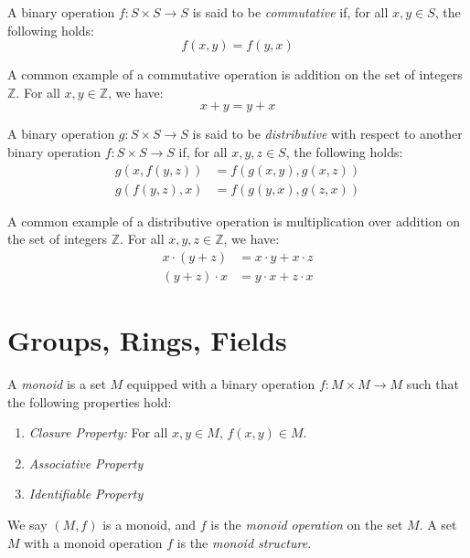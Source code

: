 \documentclass[11pt,fleqn]{book} %
\begin{document}
\begin{definition}
    A binary operation $f: S \times S \to S$ is said to be \emph{commutative} if, for all $x,y \in S$, the following holds:
    \[ f(x,y) = f(y,x) \]
\end{definition}

\begin{example}
    A common example of a commutative operation is addition on the set of integers $\mathbb{Z}$. For all $x,y \in \mathbb{Z}$, we have:
    \[ x + y = y + x \]
\end{example}

\begin{definition}
    A binary operation $g: S \times S \to S$ is said to be \emph{distributive} with respect to another binary operation $f: S \times S \to S$ if, for all $x,y,z \in S$, the following holds:
    \[ \begin{split}
        g(x,f(y,z)) &= f(g(x,y),g(x,z)) \\
        g(f(y,z),x) &= f(g(y,x),g(z,x))
    \end{split} \]
\end{definition}

\begin{example}
    A common example of a distributive operation is multiplication over addition on the set of integers $\mathbb{Z}$. For all $x,y,z \in \mathbb{Z}$, we have:
    \[ \begin{split}
        x \cdot (y + z) &= x \cdot y + x \cdot z \\
        (y + z) \cdot x &= y \cdot x + z \cdot x
    \end{split} \]
\end{example}

\newpage

\section{Groups, Rings, Fields}

\begin{definition}[Monoid]
    A \emph{monoid} is a set $M$ equipped with a binary operation $f: M \times M \to M$ such that the following properties hold:
    \begin{enumerate}
        \item \emph{Closure Property:} For all $x,y \in M$, $f(x,y) \in M$.
        \item \emph{Associative Property}
        \item \emph{Identifiable Property}
    \end{enumerate}
    We say $(M, f)$ is a monoid, and $f$ is the \emph{monoid operation} on the set $M$. A set $M$ with a monoid operation $f$ is the \emph{monoid structure}.
\end{definition}
\end{document}
